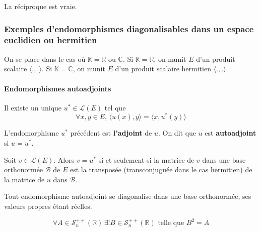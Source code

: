 	\begin{remark}
		La réciproque est vraie.
	\end{remark}
	
	\subsubsection{Exemples d'endomorphismes diagonalisables dans un espace euclidien ou hermitien}
	
	On se place dans le cas où $\mathbb{K} = \mathbb{R}$ ou $\mathbb{C}$.
	Si $\mathbb{K} = \mathbb{R}$, on munit $E$ d'un produit scalaire $\langle ., . \rangle$. Si $\mathbb{K} = \mathbb{C}$, on munit $E$ d'un produit scalaire hermitien $\langle ., . \rangle$.
	
	\paragraph{Endomorphismes autoadjoints}
	
	
	\begin{lemma}
		Il existe un unique $u^* \in \mathcal{L}(E)$ tel que
		\[ \forall x, y \in E, \, \langle u(x), y \rangle = \langle x, u^*(y) \rangle \]
	\end{lemma}
	
	\begin{definition}
		L'endomorphisme $u^*$ précédent est \textbf{l'adjoint} de $u$. On dit que $u$ est \textbf{autoadjoint} si $u = u^*$.
	\end{definition}
	
	\begin{proposition}
		Soit $v \in \mathcal{L}(E)$. Alors $v = u^*$ si et seulement si la matrice de $v$ dans une base orthonormée $\mathcal{B}$ de $E$ est la transposée (transconjuguée dans le cas hermitien) de la matrice de $u$ dans $\mathcal{B}$.
	\end{proposition}
	
	\begin{theorem}
		Tout endomorphisme autoadjoint se diagonalise dans une base orthonormée, ses valeurs propres étant réelles.
	\end{theorem}
	
	
	\begin{lemma}
		\[ \forall A \in \mathcal{S}_n^{++}(\mathbb{R}) \, \exists! B \in \mathcal{S}_n^{++}(\mathbb{R}) \text{ telle que } B^2 = A \]
	\end{lemma}
	
